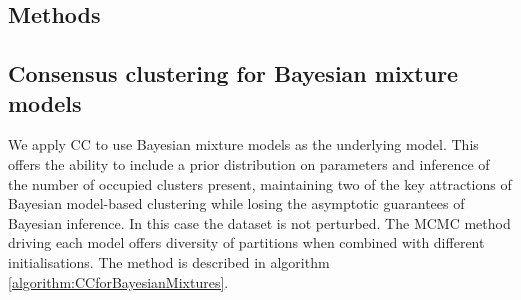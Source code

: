 \documentclass{bioinfo}
\begin{document}

\begin{methods}
\section{Methods}

\subsection{Consensus clustering for Bayesian mixture models}
We apply CC to use Bayesian mixture models as the underlying model. This offers the ability to include a prior distribution on parameters and inference of the number of occupied clusters present, maintaining two of the key attractions of Bayesian model-based clustering while losing the asymptotic guarantees of Bayesian inference. In this case the dataset is not perturbed.
The MCMC method driving each model offers diversity of partitions when combined with different initialisations. The method is described in algorithm \ref{algorithm:CCforBayesianMixtures}.



\end{methods}
\end{document}
